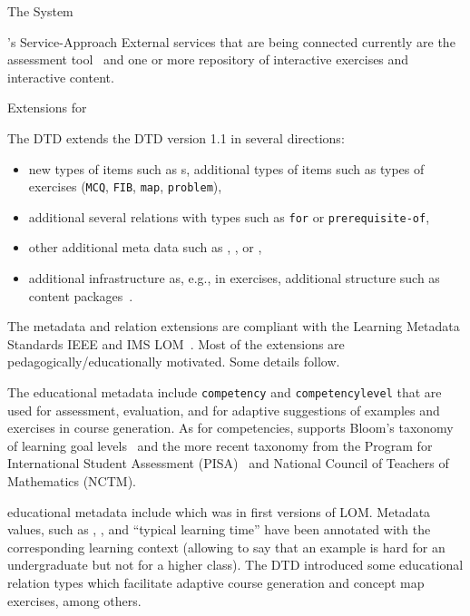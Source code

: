 \begin{omgroup}[id=activemath,short=ActiveMath,
  creators={melis,goguadse,alberto,frischauf,homik,libbrecht,cullrich}]
\begin{omgroup}{The {\activemath} System}
\begin{omgroup}{{\activemath}'s  Service-Approach}
External services that are being connected currently are the {} assessment
tool~\cite{Conejo-Siette-IJAIED-04} and one or more repository of interactive exercises
and interactive content.
\end{omgroup}
\end{omgroup}
\begin{omgroup}{{\omdoc} Extensions for {\activemath}}

The {\activemath} DTD extends the {\omdoc} DTD version 1.1 in several directions:
\begin{itemize}
\item new types of items such as s, additional types of items such
  as types of exercises ({\tt{MCQ}}, {\tt{FIB}}, {\tt{map}}, {\tt{problem}}),
\item additional several relations with types such as {\tt{for}} or {\tt{prerequisite-of}},
\item other additional meta data such as {}, {}, or
  {},
\item additional infrastructure as, e.g., in exercises, additional structure such as
  content packages~\cite{LeAMD6}.
\end{itemize}
The metadata and relation extensions are compliant with the Learning Metadata Standards
IEEE and IMS LOM~\cite{lom3_6,ims_lom}. Most of the extensions are
pedagogically/educationally motivated. Some details follow.

The educational metadata include {\tt{competency}} and {\tt{competencylevel}} that are used
for assessment, evaluation, and for adaptive suggestions of examples and exercises in
course generation.  As for competencies, {\activemath} supports Bloom's taxonomy of
learning goal levels~\cite{bloom56} and the more recent taxonomy from the Program for
International Student Assessment (PISA)~\cite{klieme04} and National Council of Teachers
of Mathematics (NCTM).

{\activemath} educational metadata include {} which was in
first versions of LOM.  Metadata values, such as {},
{}, and ``typical learning time'' have been annotated with the
corresponding learning context (allowing to say that an example is hard for an
undergraduate but not for a higher class).  The {\activemath} DTD introduced some
educational relation types which facilitate adaptive course generation and concept map
exercises, among others.


\end{omgroup}
\end{omgroup}
